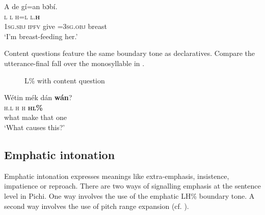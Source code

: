 \ea%
    \label{ex:key:81}
    \glll   \MakeUppercase{A}   de    gí=an    bɔbí.\\
\textsc{l}    \textsc{l}    \textsc{h=l}      \textsc{l.}\textbf{\textsc{h}}\\
\textsc{1sg.sbj}  \textsc{ipfv}    give  =\textsc{3sg.obj}  breast\\
\glt ‘I’m breast-feeding her.’  
\z

Content questions feature the same boundary tone as declaratives. Compare the utterance-final fall over the monosyllable in .

\begin{figure}
\caption{L\% with content question}
\label{fig:key:3.29}
\end{figure}


\ea%
    \label{ex:key:82}
    \glll   Wétin  mék    dán    \textbf{wán}?  \\
\textsc{h.l}    \textsc{h}    \textsc{h}    \textbf{\textsc{hl\%}}      \\
what  make  that    one\\
\glt ‘What causes this?’
\z


\newpage 
\subsection{Emphatic intonation}\label{sec:3.4.2}

Emphatic intonation expresses meanings like extra-emphasis, insistence, impatience or reproach. There are two ways of signalling emphasis at the sentence level in Pichi. One way involves the use of the emphatic LH\% boundary tone. A second way involves the use of pitch range expansion (cf. ).


